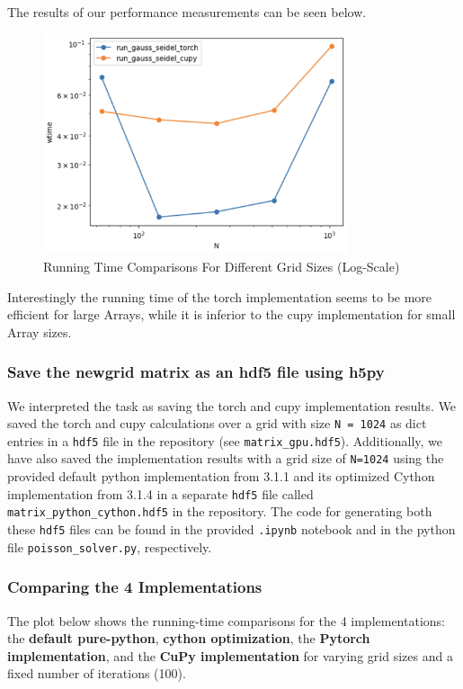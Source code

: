 \documentclass[a4paper,12pt]{article}
\begin{document}
The results of our performance measurements can be seen below.
\begin{figure}[H]
  \centering
  \includegraphics[width=0.8\textwidth]{images/cupy_torch_gpu.png}
  \caption{Running Time Comparisons For Different Grid Sizes (Log-Scale)}
\end{figure}

 Interestingly the running time of the torch implementation seems to be more efficient for large Arrays, while it is
 inferior to the cupy implementation for small Array sizes.

\subsubsection{Save the newgrid matrix as an hdf5 file using h5py }
We interpreted the task as saving the torch and cupy implementation results. We saved the torch and cupy calculations over a grid with size \verb|N = 1024|
as dict entries in a \verb|hdf5| file in the repository (see \verb|matrix_gpu.hdf5|). Additionally, we have also saved the implementation results with a grid size of \verb|N=1024| using the provided default python implementation from 3.1.1 and its optimized Cython implementation from 3.1.4 in a separate \verb|hdf5| file called \verb|matrix_python_cython.hdf5| in the repository. The code for generating both these \verb|hdf5| files can be found in the provided \verb|.ipynb| notebook and in the python file \verb|poisson_solver.py|, respectively.

\subsubsection{Comparing the 4 Implementations}
The plot below shows the running-time comparisons for the 4 implementations: the \textbf{default pure-python}, \textbf{cython optimization}, the \textbf{Pytorch implementation}, and the \textbf{CuPy implementation} for varying grid sizes and a fixed number of iterations (100). 
\end{document}
